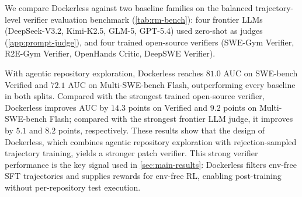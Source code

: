\documentclass[]{arxiv_template}
\newcommand{\approach}{Dockerless\xspace}
\begin{document}
We compare \approach against two baseline families on the balanced trajectory-level verifier evaluation benchmark (\cref{tab:rm-bench}): four frontier LLMs (DeepSeek-V3.2, Kimi-K2.5, GLM-5, GPT-5.4) used zero-shot as judges (\cref{app:prompt-judge}), and four trained open-source verifiers (SWE-Gym Verifier, R2E-Gym Verifier, OpenHands Critic, DeepSWE Verifier).

With agentic repository exploration, \approach reaches $81.0$ AUC on SWE-bench Verified and $72.1$ AUC on Multi-SWE-bench Flash, outperforming every baseline in both splits.
Compared with the strongest trained open-source verifier, \approach improves AUC by $14.3$ points on Verified and $9.2$ points on Multi-SWE-bench Flash; compared with the strongest frontier LLM judge, it improves by $5.1$ and $8.2$ points, respectively.
These results show that the design of \approach, which combines agentic repository exploration with rejection-sampled trajectory training, yields a stronger patch verifier.
This strong verifier performance is the key signal used in \cref{sec:main-results}: \approach filters env-free SFT trajectories and supplies rewards for env-free RL, enabling post-training without per-repository test execution.



\end{document}
